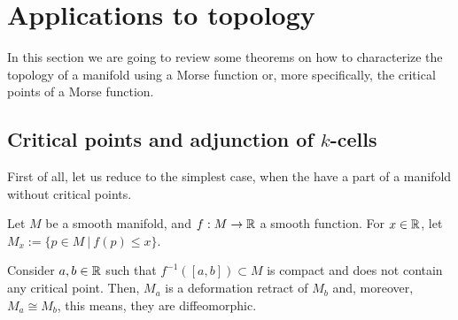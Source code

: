 \section{Applications to topology} \label{section:morse_topology}

In this section we are going to review some theorems on how to characterize the topology of a manifold using a Morse function or, more specifically, the critical points of a Morse function.

\subsection{Critical points and adjunction of $k$-cells}

First of all, let us reduce to the simplest case, when the have a part of a manifold without critical points.

Let $M$ be a smooth manifold, and $f : M \rightarrow \mathbb{R}$ a smooth function. For $x \in \mathbb{R}$, let $M_x := \{p \in M \ | \ f(p) \leq x\}$.

\begin{prop} \label{nocriticalpoints}
Consider $a, b \in \mathbb{R}$ such that $f^{-1}([a,b]) \subset M$ is compact and does not contain any critical point. Then, $M_a$ is a deformation retract of $M_b$ and, moreover, $M_a \cong M_b$, this means, they are diffeomorphic.
\end{prop}


